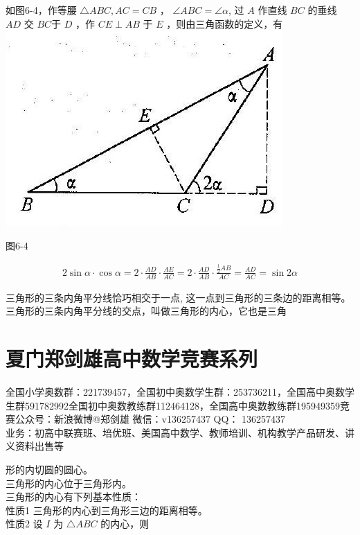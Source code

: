 \documentclass[10pt]{article}
\begin{document}
如图6-4，作等腰 $\triangle A B C, A C=C B$ ， $\angle A B C=\angle \alpha$, 过 $A$ 作直线 $B C$ 的垂线 $A D$ 交 $B C$于 $D$ ，作 $C E \perp A B$ 于 $E$ ，则由三角函数的定义，有\\
\includegraphics[max width=\textwidth, center]{2024_10_30_2c8f45efd4a519b08e1ag-059}

图6-4

\begin{align*}
2 \sin \alpha \cdot \cos \alpha=2 \cdot \frac{A D}{A B} \cdot \frac{A E}{A C}=2 \cdot \frac{A D}{A B} \cdot \frac{\frac{1}{2} A B}{A C}=\frac{A D}{A C}=\sin 2 \alpha
\end{align*}

三角形的三条内角平分线恰巧相交于一点, 这一点到三角形的三条边的距离相等。三角形的三条内角平分线的交点，叫做三角形的内心，它也是三角

\section*{夏门郑剑雄高中数学竞赛系列}
全国小学奥数群：221739457，全国初中奥数学生群：253736211，全国高中奥数学生群591782992全国初中奥数教练群112464128，全国高中奥数教练群195949359竞赛公众号：新浪微博@郑剑雄 微信：v136257437 QQ： 136257437\\
业务：初高中联赛班、培优班、美国高中数学、教师培训、机构教学产品研发、讲义资料出售等

形的内切圆的圆心。\\
三角形的内心位于三角形内。\\
三角形的内心有下列基本性质：\\
性质1 三角形的内心到三角形三边的距离相等。\\
性质2 设 $I$ 为 $\triangle A B C$ 的内心，则
\end{document}
